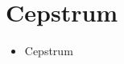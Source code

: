 \setcounter{chapter}{5}
\chapter{Cepstrum}
\thispagestyle{plain}

\begin{corollary}

	\hspace*{10mm}
	
	\vspace{5mm} %
	
	\begin{itemize}
			
			\item Cepstrum
			\
	\end{itemize}
\end{corollary}

\newpage


